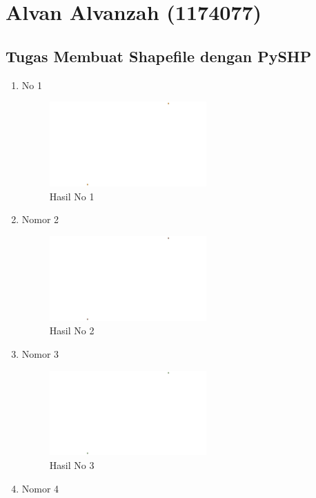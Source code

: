 \section{Alvan Alvanzah (1174077)}
\subsection{Tugas Membuat Shapefile dengan PySHP}
\begin{enumerate}
	\item No 1
	
	\begin{figure}[!htbp]
		\includegraphics[width=6cm]{figures/Tugas2/1174077/no1.png}
		\centering
		\caption{Hasil No 1}
	\end{figure}
	\item Nomor 2
	
	\begin{figure}[!htbp]
		\includegraphics[width=6cm]{figures/Tugas2/1174077/no2.png}
		\centering
		\caption{Hasil No 2}
	\end{figure}
	\item Nomor 3
	
	\begin{figure}[!htbp]
		\includegraphics[width=6cm]{figures/Tugas2/1174077/no3.png}
		\centering
		\caption{Hasil No 3}
	\end{figure}
	\item Nomor 4
	
	\begin{figure}[!htbp]

\end{figure}
\end{enumerate}
